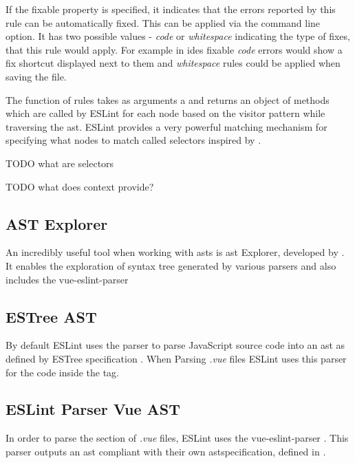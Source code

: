 If the fixable property is specified, it indicates that the errors reported by this rule can be automatically fixed. This can be applied via the  command line option. It has two possible values - \textit{code} or \textit{whitespace} indicating the type of fixes, that this rule would apply. For example in \glspl{ide} fixable \textit{code} errors would show a fix shortcut displayed next to them and \textit{whitespace} rules could be applied when saving the file.

The  function of rules takes as arguments a  and returns an object of methods which are called by ESLint for each node based on the \gls{visitor} pattern while traversing the \gls{ast}. ESLint provides a very powerful matching mechanism for specifying what nodes to match called selectors \parencite{eslintSelectors} inspired by \textcite{estoolsEsQuery}. 


TODO what are selectors

TODO what does context provide?

\subsection{AST Explorer}
An incredibly useful tool when working with \glspl{ast} is \gls{ast} Explorer, developed by \textcite{astexplorer_fkling2021Jan}. It enables the exploration of syntax tree generated by various parsers and also includes the vue-eslint-parser \parencite{eslint_vue_parser}

\subsection{ESTree AST}
By default ESLint uses the \parencite{eslintEspree} parser to parse JavaScript source code into an \gls{ast} as defined by ESTree specification \parencite{estreeASTSpec}. When Parsing \textit{.vue} files ESLint uses this parser for the code inside the  tag.
  
\subsection{ESLint Parser Vue AST}
In order to parse the  section of \textit{.vue} files, ESLint uses the vue-eslint-parser \parencite{eslint_vue_parser}. This parser outputs an  \gls{ast} compliant with their own  \gls{ast}specification, defined in \parencite{eslint_vue_parser_ast}.
